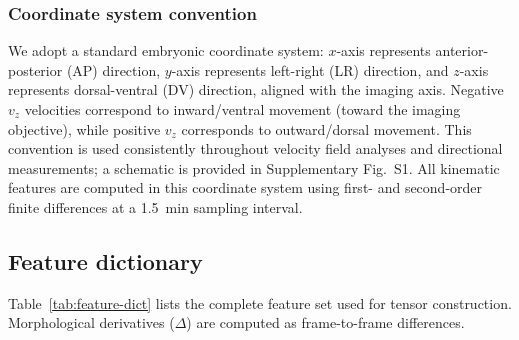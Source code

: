 \documentclass[unnumsec,webpdf,modern,large,namedate]{oup-authoring-template}%
\theoremstyle{thmstyleone}\newtheorem{theorem}{Theorem}
\theoremstyle{thmstyletwo}\newtheorem{example}{Example}
\theoremstyle{thmstylethree}\newtheorem{definition}{Definition}
\begin{document}
\subsubsection{Coordinate system convention}
We adopt a standard embryonic coordinate system: $x$-axis represents anterior-posterior (AP) direction, $y$-axis represents left-right (LR) direction, and $z$-axis represents dorsal-ventral (DV) direction, aligned with the imaging axis. Negative $v_z$ velocities correspond to inward/ventral movement (toward the imaging objective), while positive $v_z$ corresponds to outward/dorsal movement. This convention is used consistently throughout velocity field analyses and directional measurements; a schematic is provided in Supplementary Fig.~S1. All kinematic features are computed in this coordinate system using first- and second-order finite differences at a 1.5~min sampling interval.

\subsection{Feature dictionary}
Table~\ref{tab:feature-dict} lists the complete feature set used for tensor construction. Morphological derivatives ($\Delta$) are computed as frame-to-frame differences.
\end{document}
